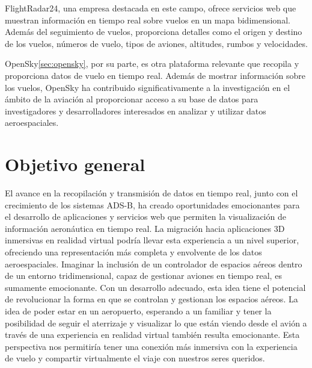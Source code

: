 \documentclass[a4paper, 11pt]{book}
\begin{document}
FlightRadar24, una empresa destacada en este campo, ofrece servicios web que muestran información en tiempo real sobre vuelos en un mapa bidimensional. Además del seguimiento de vuelos, proporciona detalles como el origen y destino de los vuelos, números de vuelo, tipos de aviones, altitudes, rumbos y velocidades.

OpenSky\ref{sec:opensky}, por su parte, es otra plataforma relevante que recopila y proporciona datos de vuelo en tiempo real. Además de mostrar información sobre los vuelos, OpenSky ha contribuido significativamente a la investigación en el ámbito de la aviación al proporcionar acceso a su base de datos para investigadores y desarrolladores interesados en analizar y utilizar datos aeroespaciales.


\newpage
\section{Objetivo general}
\label{sec:objetivoGeneral}
El avance en la recopilación y transmisión de datos en tiempo real, junto con el crecimiento de los sistemas ADS-B, ha creado oportunidades emocionantes para el desarrollo de aplicaciones y servicios web que permiten la visualización de información aeronáutica en tiempo real. La migración hacia aplicaciones 3D inmersivas en realidad virtual podría llevar esta experiencia a un nivel superior, ofreciendo una representación más completa y envolvente de los datos aeroespaciales.
Imaginar la inclusión de un controlador de espacios aéreos dentro de un entorno tridimensional, capaz de gestionar aviones en tiempo real, es sumamente emocionante. Con un desarrollo adecuado, esta idea tiene el potencial de revolucionar la forma en que se controlan y gestionan los espacios aéreos.
La idea de poder estar en un aeropuerto, esperando a un familiar y tener la posibilidad de seguir el aterrizaje y visualizar lo que están viendo desde el avión a través de una experiencia en realidad virtual también resulta emocionante. Esta perspectiva nos permitiría tener una conexión más inmersiva con la experiencia de vuelo y compartir virtualmente el viaje con nuestros seres queridos. 
\end{document}
